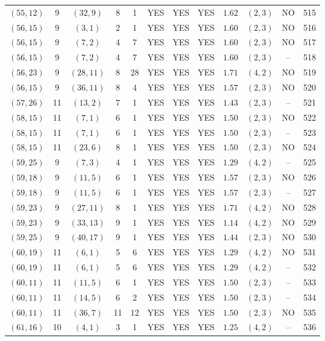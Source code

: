 \begin{longtable}{|c|c|c|c|c|c|c|c|c|c|c|c|}
$(55,12)$ & 9 & $(32,9)$ & 8 & 1 & YES & YES & YES & $1.62$ & $(2,3)$ & NO & 515\\
$(56,15)$ & 9 & $(3,1)$ & 2 & 1 & YES & YES & YES & $1.60$ & $(2,3)$ & NO & 516\\
$(56,15)$ & 9 & $(7,2)$ & 4 & 7 & YES & YES & YES & $1.60$ & $(2,3)$ & NO & 517\\
$(56,15)$ & 9 & $(7,2)$ & 4 & 7 & YES & YES & YES & $1.60$ & $(2,3)$ & -- & 518\\
$(56,23)$ & 9 & $(28,11)$ & 8 & 28 & YES & YES & YES & $1.71$ & $(4,2)$ & NO & 519\\
$(56,15)$ & 9 & $(36,11)$ & 8 & 4 & YES & YES & YES & $1.57$ & $(2,3)$ & NO & 520\\
$(57,26)$ & 11 & $(13,2)$ & 7 & 1 & YES & YES & YES & $1.43$ & $(2,3)$ & -- & 521\\
$(58,15)$ & 11 & $(7,1)$ & 6 & 1 & YES & YES & YES & $1.50$ & $(2,3)$ & NO & 522\\
$(58,15)$ & 11 & $(7,1)$ & 6 & 1 & YES & YES & YES & $1.50$ & $(2,3)$ & -- & 523\\
$(58,15)$ & 11 & $(23,6)$ & 8 & 1 & YES & YES & YES & $1.50$ & $(2,3)$ & NO & 524\\
$(59,25)$ & 9 & $(7,3)$ & 4 & 1 & YES & YES & YES & $1.29$ & $(4,2)$ & -- & 525\\
$(59,18)$ & 9 & $(11,5)$ & 6 & 1 & YES & YES & YES & $1.57$ & $(2,3)$ & NO & 526\\
$(59,18)$ & 9 & $(11,5)$ & 6 & 1 & YES & YES & YES & $1.57$ & $(2,3)$ & -- & 527\\
$(59,23)$ & 9 & $(27,11)$ & 8 & 1 & YES & YES & YES & $1.71$ & $(4,2)$ & NO & 528\\
$(59,23)$ & 9 & $(33,13)$ & 9 & 1 & YES & YES & YES & $1.14$ & $(4,2)$ & NO & 529\\
$(59,25)$ & 9 & $(40,17)$ & 9 & 1 & YES & YES & YES & $1.44$ & $(2,3)$ & NO & 530\\
$(60,19)$ & 11 & $(6,1)$ & 5 & 6 & YES & YES & YES & $1.29$ & $(4,2)$ & NO & 531\\
$(60,19)$ & 11 & $(6,1)$ & 5 & 6 & YES & YES & YES & $1.29$ & $(4,2)$ & -- & 532\\
$(60,11)$ & 11 & $(11,5)$ & 6 & 1 & YES & YES & YES & $1.50$ & $(2,3)$ & -- & 533\\
$(60,11)$ & 11 & $(14,5)$ & 6 & 2 & YES & YES & YES & $1.50$ & $(2,3)$ & -- & 534\\
$(60,11)$ & 11 & $(36,7)$ & 11 & 12 & YES & YES & YES & $1.50$ & $(2,3)$ & NO & 535\\
$(61,16)$ & 10 & $(4,1)$ & 3 & 1 & YES & YES & YES & $1.25$ & $(4,2)$ & -- & 536\\

\end{longtable}
